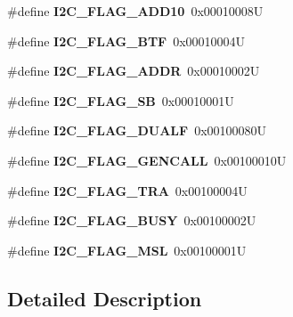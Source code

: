 \begin{DoxyCompactItemize}
\#define {\bfseries I2\+C\+\_\+\+F\+L\+A\+G\+\_\+\+A\+D\+D10}~0x00010008U
\item 
\mbox{\label{group___i2_c___flag__definition_ga4dc3d44342007a5cd21c3baa0d938606}} 
\#define {\bfseries I2\+C\+\_\+\+F\+L\+A\+G\+\_\+\+B\+TF}~0x00010004U
\item 
\mbox{\label{group___i2_c___flag__definition_ga5472d1196e934e0cc471aba8f66af416}} 
\#define {\bfseries I2\+C\+\_\+\+F\+L\+A\+G\+\_\+\+A\+D\+DR}~0x00010002U
\item 
\mbox{\label{group___i2_c___flag__definition_gae009ab84be03fcc438625b1c39376ad4}} 
\#define {\bfseries I2\+C\+\_\+\+F\+L\+A\+G\+\_\+\+SB}~0x00010001U
\item 
\mbox{\label{group___i2_c___flag__definition_ga3755b783aa73568659478c2e2e45e27f}} 
\#define {\bfseries I2\+C\+\_\+\+F\+L\+A\+G\+\_\+\+D\+U\+A\+LF}~0x00100080U
\item 
\mbox{\label{group___i2_c___flag__definition_gab3a93b6840ad406c2fc09e0e96c59b88}} 
\#define {\bfseries I2\+C\+\_\+\+F\+L\+A\+G\+\_\+\+G\+E\+N\+C\+A\+LL}~0x00100010U
\item 
\mbox{\label{group___i2_c___flag__definition_ga0359a5f960670d51cb17e659d32498ea}} 
\#define {\bfseries I2\+C\+\_\+\+F\+L\+A\+G\+\_\+\+T\+RA}~0x00100004U
\item 
\mbox{\label{group___i2_c___flag__definition_ga50f69f043d99600221076100823b6ff3}} 
\#define {\bfseries I2\+C\+\_\+\+F\+L\+A\+G\+\_\+\+B\+U\+SY}~0x00100002U
\item 
\mbox{\label{group___i2_c___flag__definition_gae8e6a404cbfd70420d278d520304f368}} 
\#define {\bfseries I2\+C\+\_\+\+F\+L\+A\+G\+\_\+\+M\+SL}~0x00100001U
\end{DoxyCompactItemize}


\subsection{Detailed Description}

